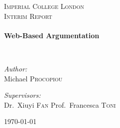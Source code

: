 \begin{titlepage}
\begin{center}



\textsc{\LARGE Imperial College London}\\[1.5cm]

\textsc{\Large Interim Report}\\[0.5cm]

\HRule \\[0.4cm]
{ \huge \bfseries Web-Based Argumentation \\[0.4cm] }

\HRule \\[1.5cm]

\begin{minipage}{0.4\textwidth}
\begin{flushleft} \large
\emph{Author:}\\
Michael \textsc{Procopiou}
\end{flushleft}
\end{minipage}
\begin{minipage}{0.4\textwidth}
\begin{flushright} \large
\emph{Supervisors:} \\
Dr.~Xiuyi \textsc{Fan}
Prof.~Francesca \textsc{Toni}
\end{flushright}
\end{minipage}

\vfill

{\large \today}

\end{center}
\end{titlepage}